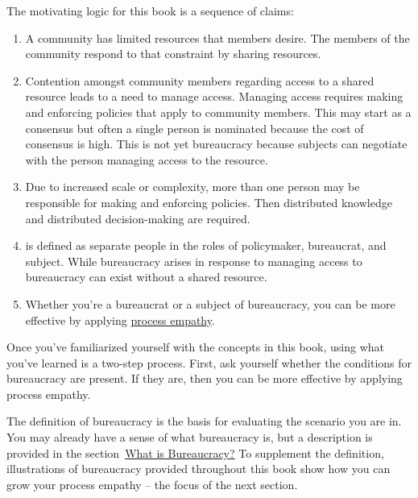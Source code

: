 The motivating logic for this book is a sequence of claims:
\begin{enumerate}
    \item A community has limited resources that members desire. The members of the community respond to that constraint by sharing resources.
    \item Contention amongst community members regarding access to a \gls{shared resource} leads to a need to manage access.  
    \iftoggle{glossaryinmargin}{\marginpar{[Glossary]}}{}%
    Managing access requires making and enforcing policies that apply to community members. This may start as a consensus but often a single person is nominated because the cost of consensus is high. This is not yet bureaucracy because subjects can negotiate with the person managing access to the resource.
    \item Due to increased scale or complexity, more than one person may be responsible for making and enforcing policies. Then distributed knowledge and distributed decision-making are required.
    \item 
\iftoggle{glossarysubstitutionworks}{\Gls{bureaucracy}}{Bureaucracy}%
\iftoggle{glossaryinmargin}{\marginpar{[Glossary]}}{} is defined as separate people in the roles of policymaker, bureaucrat, and subject. While bureaucracy arises in response to managing access to 
\iftoggle{glossarysubstitutionworks}{\glspl{shared resource},}{shared resources,} bureaucracy can exist without a shared resource.
    \item Whether you're a \gls{bureaucrat} 
    \iftoggle{glossaryinmargin}{\marginpar{[Glossary]}}{}%
    or a subject of bureaucracy, you can be more effective by applying \hyperref[sec:process-empathy]{process empathy}.
\end{enumerate}

Once you've familiarized yourself with the concepts in this book, using what you've learned is a two-step process. First, ask yourself whether the conditions for bureaucracy are present. If they are, then you can be more effective by applying process empathy.

The definition of bureaucracy is the basis for evaluating the scenario you are in. You may already have a sense of what bureaucracy is, but a description is provided %
\iftoggle{haspagenumbers}{ on page~\pageref{sec:define-bureaucracy}}{} 
in the section~\hyperref[sec:define-bureaucracy]{What is Bureaucracy?} To supplement the definition, illustrations of bureaucracy provided throughout this book show how you can grow your process empathy -- the focus of the next section. 